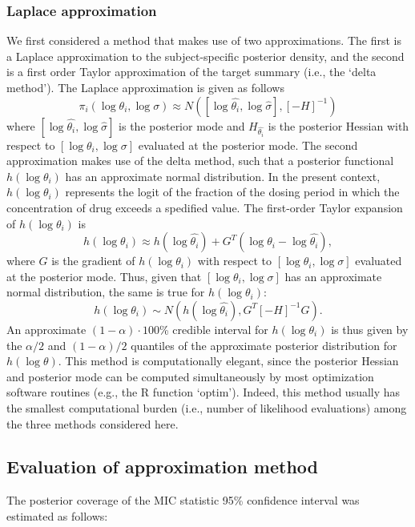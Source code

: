 \documentclass{article}\usepackage[]{graphicx}\usepackage[]{color}
\begin{document}
\subsubsection{Laplace approximation}
We first considered a method that makes use of two approximations. The first is a Laplace approximation to the subject-specific posterior density, and the second is a first order Taylor approximation of the target summary (i.e., the `delta method'). The Laplace approximation is given as follows
$$\pi_i(\log \theta_i, \log \sigma) \approx N([\log \hat{\theta_i},\log \hat{\sigma}], [-H]^{-1})$$
\noindent where $[\log \hat{\theta_i},\log \hat{\sigma}]$ is the posterior mode and $H_{\hat{\theta_i}}$ is the posterior Hessian with respect to $[\log \theta_i, \log \sigma]$ evaluated at the posterior mode. The second approximation makes use of the delta method, such that a posterior functional $h(\log \theta_i)$ has an approximate normal distribution. In the present context, $h(\log \theta_i)$ represents the logit of the fraction of the dosing period in which the concentration of drug exceeds a spedified value. The first-order Taylor expansion of $h(\log \theta_i)$ is
\begin{displaymath}
h(\log \theta_i) \approx  h(\log \hat{\theta_i}) + G^T(\log \theta_i - \log \hat{\theta_i}),
\end{displaymath}
\noindent where $G$ is the gradient of $h(\log \theta_i)$ with respect to $[\log \theta_i, \log \sigma]$ evaluated at the posterior mode. Thus, given that $[\log \theta_i, \log \sigma]$ has an approximate normal distribution, the same is true for $h(\log \theta_i)$:
\begin{displaymath}
h(\log \theta_i) \sim N(h(\log \hat{\theta_i}), G^T[-H]^{-1}G).
\end{displaymath}
\noindent An approximate $(1-\alpha)\cdot 100$\% credible interval for $h(\log \theta_i)$ is thus given by the $\alpha/2$ and $(1-\alpha)/2$ quantiles of the approximate posterior distribution for $h(\log \theta)$. This method is computationally elegant, since the posterior Hessian and posterior mode can be computed simultaneously by most optimization software routines (e.g., the R function `optim'). Indeed, this method usually has the smallest computational burden (i.e., number of likelihood evaluations) among the three methods considered here.

\subsection{Evaluation of approximation method}
The posterior coverage of the MIC statistic 95\% confidence interval was estimated as follows:
\end{document}
